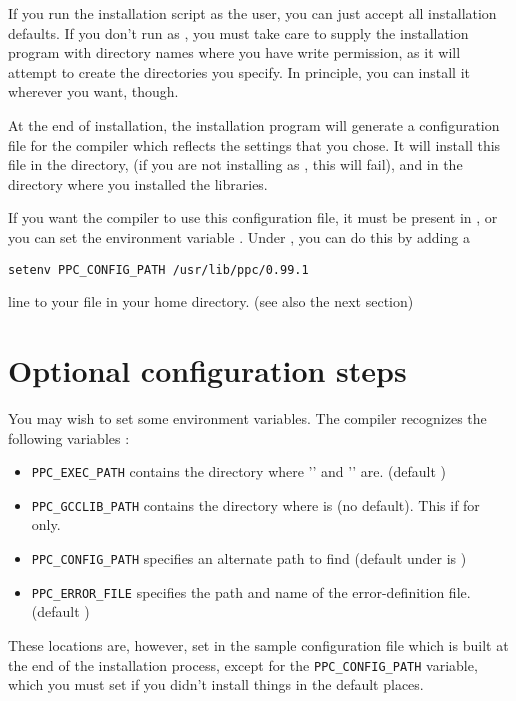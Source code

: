 \documentclass{report}
\begin{document}
If you run the installation script as the  user, you can just accept all installation
defaults. If you don't run as , you must take care to supply the
installation program with directory names where you have write permission,
as it will attempt to create the directories you specify.
In principle, you can install it wherever you want, though.

At the end of installation, the installation program will generate a
configuration file for the \fpc compiler which reflects the settings
that you chose. It will install this file in the  directory, (if
you are not installing as , this will fail), and in the
directory where you installed the libraries.

If you want the \fpc compiler to use this configuration file, it must be
present in , or you can set the environment variable
. Under , you can do this by adding  a 
\begin{verbatim}
setenv PPC_CONFIG_PATH /usr/lib/ppc/0.99.1
\end{verbatim}
line to your  file in your home directory. 
(see also the next section) 

\section{Optional configuration steps}
You may wish to set some environment variables. The \fpc compiler
recognizes the following variables :
\begin{itemize}
\item \verb|PPC_EXEC_PATH| contains the directory where '' and
'' are. (default )
\item \verb|PPC_GCCLIB_PATH| contains the directory where  
is (no default). This if for \linux only.
\item \verb|PPC_CONFIG_PATH| specifies an alternate path to find
 (default under \linux is )
\item \verb|PPC_ERROR_FILE|  specifies the path and name of the error-definition file. 
                  (default )
\end{itemize}

These locations are, however, set in the sample configuration file which is 
built at the end of the installation process, except for the
\verb|PPC_CONFIG_PATH| variable, which you must set if you didn't install
things in the default places.
\end{document}
